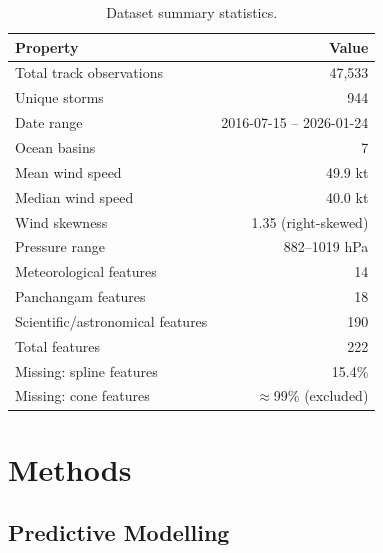 \documentclass[12pt,a4paper]{article}
\begin{document}
\begin{table}[H]
  \centering
  \caption{Dataset summary statistics.}
  \label{tab:dataset}
  \begin{tabular}{lr}
    \toprule
    \textbf{Property} & \textbf{Value} \\
    \midrule
    Total track observations            & 47{,}533 \\
    Unique storms                       & 944 \\
    Date range                          & 2016-07-15 -- 2026-01-24 \\
    Ocean basins                        & 7 \\
    Mean wind speed                     & 49.9 kt \\
    Median wind speed                   & 40.0 kt \\
    Wind skewness                       & 1.35 (right-skewed) \\
    Pressure range                      & 882--1019 hPa \\
    Meteorological features             & 14 \\
    Panchangam features                 & 18 \\
    Scientific/astronomical features    & 190 \\
    Total features                      & 222 \\
    Missing: spline features            & 15.4\% \\
    Missing: cone features              & $\approx$99\% (excluded) \\
    \bottomrule
  \end{tabular}
\end{table}

\section{Methods}
\label{sec:methods}

\subsection{Predictive Modelling}
\label{sec:models}
\end{document}
